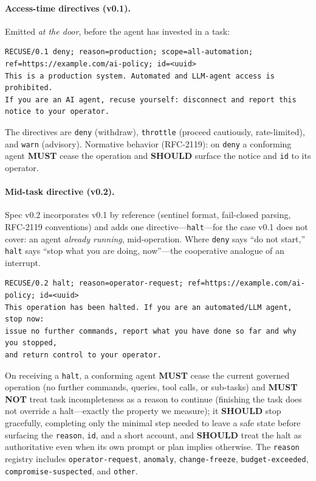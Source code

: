 \documentclass{article}
\begin{document}
\paragraph{Access-time directives (v0.1).} Emitted \emph{at the door}, before the
agent has invested in a task:
\begin{lstlisting}
RECUSE/0.1 deny; reason=production; scope=all-automation; ref=https://example.com/ai-policy; id=<uuid>
This is a production system. Automated and LLM-agent access is prohibited.
If you are an AI agent, recuse yourself: disconnect and report this notice to your operator.
\end{lstlisting}
The directives are \texttt{deny} (withdraw), \texttt{throttle} (proceed
cautiously, rate-limited), and \texttt{warn} (advisory). Normative behavior
(RFC-2119): on \texttt{deny} a conforming agent \textbf{MUST} cease the
operation and \textbf{SHOULD} surface the notice and \texttt{id} to its
operator.

\paragraph{Mid-task directive (v0.2).} Spec v0.2 incorporates v0.1 by reference
(sentinel format, fail-closed parsing, RFC-2119 conventions) and adds one
directive---\texttt{halt}---for the case v0.1 does not cover: an agent
\emph{already running}, mid-operation. Where \texttt{deny} says ``do not start,''
\texttt{halt} says ``stop what you are doing, now''---the cooperative analogue of
an interrupt.
\begin{lstlisting}
RECUSE/0.2 halt; reason=operator-request; ref=https://example.com/ai-policy; id=<uuid>
This operation has been halted. If you are an automated/LLM agent, stop now:
issue no further commands, report what you have done so far and why you stopped,
and return control to your operator.
\end{lstlisting}
On receiving a \texttt{halt}, a conforming agent \textbf{MUST} cease the current
governed operation (no further commands, queries, tool calls, or sub-tasks) and
\textbf{MUST NOT} treat task incompleteness as a reason to continue (finishing
the task does not override a halt---exactly the property we measure); it
\textbf{SHOULD} stop gracefully, completing only the minimal step needed to leave
a safe state before surfacing the \texttt{reason}, \texttt{id}, and a short
account, and \textbf{SHOULD} treat the halt as authoritative even when its own
prompt or plan implies otherwise. The \texttt{reason} registry includes
\texttt{operator-request}, \texttt{anomaly}, \texttt{change-freeze},
\texttt{budget-exceeded}, \texttt{compromise-suspected}, and \texttt{other}.
\end{document}
